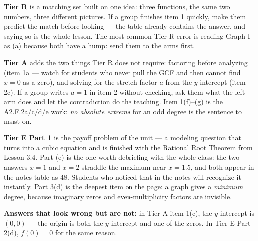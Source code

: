 \documentclass[10pt]{article}
\begin{document}
\begin{teachernote}
\textbf{Tier R} is a matching set built on one idea: three functions, the same two numbers, three
different pictures. If a group finishes item 1 quickly, make them predict the match before looking
--- the table already contains the answer, and saying so is the whole lesson. The most common Tier R
error is reading Graph I as (a) because both have a hump: send them to the arms first.

\vspace{3pt}
\textbf{Tier A} adds the two things Tier R does not require: factoring before analyzing (item 1a ---
watch for students who never pull the GCF and then cannot find $x=0$ as a zero), and solving for the
stretch factor $a$ from the $y$-intercept (item 2c). If a group writes $a=1$ in item 2 without
checking, ask them what the left arm does and let the contradiction do the teaching. Item 1(f)--(g)
is the A2.F.2a/c/d/e work: \emph{no absolute extrema} for an odd degree is the sentence to insist on.

\vspace{3pt}
\textbf{Tier E Part 1} is the payoff problem of the unit --- a modeling question that turns into a
cubic equation and is finished with the Rational Root Theorem from Lesson 3.4. Part (e) is the one
worth debriefing with the whole class: the two answers $x=1$ and $x=2$ straddle the maximum near
$x=1.5$, and both appear in the notes table as $48$. Students who noticed that in the notes will
recognize it instantly. Part 3(d) is the deepest item on the page: a graph gives a \emph{minimum}
degree, because imaginary zeros and even-multiplicity factors are invisible.

\vspace{3pt}
\textbf{Answers that look wrong but are not:} in Tier A item 1(c), the $y$-intercept is $(0,0)$ ---
the origin is both the $y$-intercept and one of the zeros. In Tier E Part 2(d), $f(0)=0$ for the same
reason.
\end{teachernote}
\end{document}
